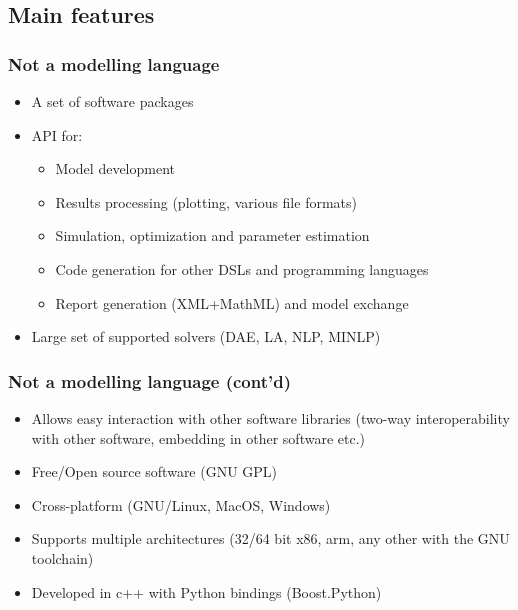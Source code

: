 \documentclass{beamer}
\begin{document}
\subsection{Main features}
\begin{frame}
\frametitle{Not a modelling language}
\begin{itemize}
  \item A set of software packages
  \item API for:
  \begin{itemize}
    \item Model development
    \item Results processing (plotting, various file formats)
    \item Simulation, optimization and parameter estimation
    \item Code generation for other DSLs and programming languages
    \item Report generation (XML+MathML) and model exchange
  \end{itemize}
  \item Large set of supported solvers (DAE, LA, NLP, MINLP)
\end{itemize}
\end{frame}

\begin{frame}
\frametitle{Not a modelling language (cont'd)}
\begin{itemize}
  \item Allows easy interaction with other software libraries (two-way interoperability with other software, embedding in other software etc.)
  \item Free/Open source software (GNU GPL)
  \item Cross-platform (GNU/Linux, MacOS, Windows)
  \item Supports multiple architectures (32/64 bit x86, arm, any other with the GNU toolchain)
  \item Developed in c++ with Python bindings (Boost.Python)
\end{itemize}
\end{frame}
\end{document}
